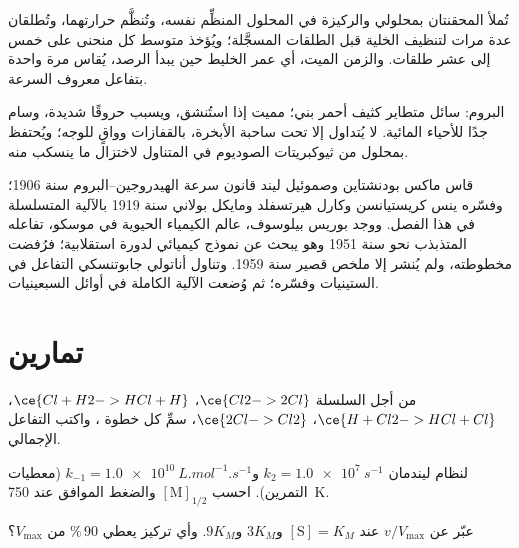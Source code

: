 \begin{inthelab}
تُملأ المحقنتان بمحلولي  والركيزة في المحلول المنظِّم
نفسه، وتُنظَّم حرارتهما، وتُطلقان عدة مرات لتنظيف الخلية قبل
الطلقات المسجَّلة؛ ويُؤخذ متوسط كل منحنى على خمس إلى عشر طلقات. 
والزمن الميت، أي عمر الخليط حين يبدأ الرصد، يُقاس مرة واحدة بتفاعل
معروف السرعة.
\end{inthelab}

\begin{safety}{}
البروم: سائل متطاير كثيف أحمر بني؛ مميت إذا استُنشق، ويسبب
حروقًا شديدة، وسام جدًا للأحياء المائية. لا يُتداول إلا تحت ساحبة الأبخرة، بالقفازات
وواقٍ للوجه؛ ويُحتفظ بمحلول من ثيوكبريتات الصوديوم في المتناول لاختزال
ما ينسكب منه.
\end{safety}

\begin{history}
قاس ماكس بودنشتاين وصموئيل ليند قانون سرعة الهيدروجين--البروم سنة
1906؛ وفسّره ينس كريستيانسن وكارل هيرتسفلد ومايكل بولاني سنة
1919 بالآلية المتسلسلة في هذا الفصل. ووجد بوريس بيلوسوف، عالم الكيمياء الحيوية في
موسكو، تفاعله المتذبذب نحو سنة 1951 وهو يبحث عن
نموذج كيميائي لدورة استقلابية؛ فرُفضت مخطوطته، ولم يُنشر إلا
ملخص قصير سنة 1959. وتناول أناتولي جابوتنسكي التفاعل في
الستينيات وفسّره؛ ثم وُضعت الآلية الكاملة في أوائل
السبعينيات.
\end{history}

\section{تمارين}

\begin{exercise}[$\star$]\label{exo:b3:complex-kinetics:1}
من أجل السلسلة $\ce{Cl2 -> 2 Cl}$، $\ce{Cl + H2 -> HCl + H}$، $\ce{H + Cl2 -> HCl + Cl}$، $\ce{2 Cl -> Cl2}$،
سمِّ كل خطوة ، واكتب التفاعل الإجمالي.
\end{exercise}

\begin{exercise}[$\star$]\label{exo:b3:complex-kinetics:2}
لنظام ليندمان $k_2 = \qty{1.0e7}{s^{-1}}$ و$k_{-1} = \qty{1.0e10}{L.mol^{-1}.s^{-1}}$ (معطيات
التمرين). احسب $[\mathrm M]_{1/2}$ والضغط الموافق عند \qty{750}{K}.
\end{exercise}

\begin{exercise}[$\star$]\label{exo:b3:complex-kinetics:3}
عبّر عن $v/V_{\max}$ عند $[\mathrm S] = K_M$ و$3K_M$ و$9K_M$. وأي تركيز يعطي 90\,\% من
$V_{\max}$؟
\end{exercise}

